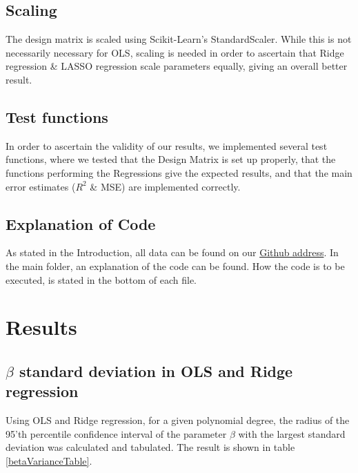 \documentclass[11pt,a4paper,titlepage]{article}
\begin{document}
\subsection{Scaling}
The design matrix is scaled using Scikit-Learn's StandardScaler. While this is not necessarily necessary for OLS, scaling is needed in order to ascertain that Ridge regression \& LASSO regression scale parameters equally, giving an overall better result. 
\subsection{Test functions}
In order to ascertain the validity of our results, we implemented several test functions, where we tested that the Design Matrix is set up properly, that the functions performing the Regressions give the expected results, and that the main error estimates ($R^2$ \& MSE) are implemented correctly. 
\subsection{Explanation of Code}
As stated in the Introduction, all data can be found on our \href{https://github.com/schraderSimon/FYS-STK/tree/master/project1}{Github address}. In the main folder, an explanation of the code can be found. How the code is to be executed, is stated in the bottom of each file.
\section{Results}

\subsection{$\beta$ standard deviation in OLS and Ridge regression}
Using OLS and Ridge regression, for a given polynomial degree, the radius of the 95'th percentile confidence interval of the parameter $\beta$ with the largest standard deviation was calculated and tabulated. The result is shown in table \ref{betaVarianceTable}.
\end{document}

